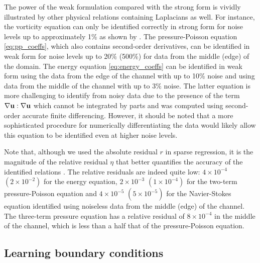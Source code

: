 \documentclass[preprint]{article}
\def\bi#1{\textbf{#1}}
\begin{document}
The power of the weak formulation compared with the strong form is vividly illustrated by other physical relations containing Laplacians as well. For instance, the vorticity equation can only be identified correctly in strong form for noise levels up to approximately 1\% as shown by \citet{rudy2017}. The pressure-Poisson equation \eqref{eq:pp_coeffs}, which also contains second-order derivatives, can be identified in weak form for noise levels up to 20\% (500\%) for data from the middle (edge) of the domain. The energy equation \eqref{eq:energy_coeffs} can be identified in weak form using the data from the edge of the channel with up to 10\% noise and using data from the middle of the channel with up to $3\%$ noise. The latter equation is more challenging to identify from noisy data due to the presence of the term $\nabla{\bf u} : \nabla {\bi u}$ which cannot be integrated by parts and was computed using second-order accurate finite differencing. However, it should be noted that a more sophisticated procedure for numerically differentiating the data would likely allow this equation to be identified even at higher noise levels. 

Note that, although we used the absolute residual $r$ in sparse regression, it is the magnitude of the relative residual $\eta$ that better quantifies the accuracy of the identified relations \citep{reinbold2021}. The relative residuals are indeed quite low: $4\!\times\!10^{-4}$ $(2\!\times\!10^{-2})$  for the energy equation, $2 \! \times \! 10^{-3}$ $(1\!\times\!10^{-4})$ for the two-term pressure-Poisson equation and $4\!\times\!10^{-5}$ $(5\!\times\!10^{-5})$ for the Navier-Stokes equation identified using noiseless data from the middle (edge) of the channel. The three-term pressure equation has a relative residual of $8 \! \times \! 10^{-4}$ in the middle of the channel, which is less than a half that of the pressure-Poisson equation.

\subsection{Learning boundary conditions}
\end{document}

